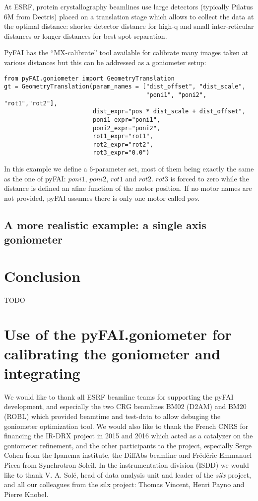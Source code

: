 \documentclass{iucr}              %
\begin{document}
At ESRF, protein crystallography beamlines use large detectors (typically
Pilatus 6M from Dectris) placed on a translation stage which allows to collect
the data at the optimal distance: shorter detector distance for high-q and small
inter-reticular distances or longer distances for best spot separation.

PyFAI has the ``MX-calibrate'' tool available for calibrate many images taken at
various distances but this can be addressed as a goniometer setup: 

\begin{verbatim}
from pyFAI.goniometer import GeometryTranslation
gt = GeometryTranslation(param_names = ["dist_offset", "dist_scale", 
                                        "poni1", "poni2", "rot1","rot2"],
                         dist_expr="pos * dist_scale + dist_offset", 
                         poni1_expr="poni1",
                         poni2_expr="poni2", 
                         rot1_expr="rot1", 
                         rot2_expr="rot2", 
                         rot3_expr="0.0")
\end{verbatim}
 
In this example we define a 6-parameter set, most of them being exactly the same
as the one of pyFAI: $poni1$, $poni2$, $rot1$ and $rot2$. $rot3$ is forced to
zero while the distance is defined an afine function of the motor position.  
If no motor names are not provided, pyFAI assumes there is only one motor
called $pos$.

  
\subsection{A more realistic example: a single axis goniometer}

\section{Conclusion}

TODO



\appendix
\section{Use of the pyFAI.goniometer for calibrating the goniometer and
integrating}
 

We would like to thank all ESRF beamline teams for supporting the
pyFAI development, and especially the two CRG beamlines BM02 (D2AM) and BM20
(ROBL) which provided beamtime and test-data to allow debuging the goniometer
optimization tool.
We would also like to thank the French CNRS for financing the IR-DRX project
in 2015 and 2016 which acted as a catalyzer on the goniometer refinement,
and the other participants to the project, especially Serge Cohen from the
Ipanema institute, the DiffAbs beamline and Frédéric-Emmanuel Picca from
Synchrotron Soleil.
In the instrumentation division (ISDD) we would like to thank V. A. Solé,  head
of data analysis unit and leader of the \textit{silx} project, and all our
colleagues from the silx project: Thomas Vincent, Henri Payno and Pierre Knobel.
\end{document}
